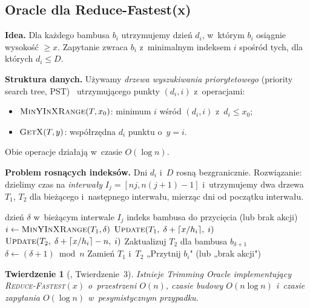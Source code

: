 \documentclass[12pt,a4paper]{article}
\theoremstyle{plain}
\newtheorem{twierdzenie}{Twierdzenie}[section]
\theoremstyle{definition}
\theoremstyle{remark}
\newcommand{\RF}{\textsc{Reduce-Fastest}}
\begin{document}
\subsection{Oracle dla Reduce-Fastest(x)}

\textbf{Idea.} Dla każdego bambusa $b_i$ utrzymujemy dzień $d_i$,
w~którym $b_i$ osiągnie wysokość $\geq x$. Zapytanie zwraca $b_i$
z~minimalnym indeksem $i$ spośród tych, dla których $d_i \leq D$.

\textbf{Struktura danych.} Używamy \emph{drzewa wyszukiwania priorytetowego}
(priority search tree, PST)~\cite{mccreight1985} utrzymującego punkty
$(d_i, i)$ z~operacjami:
\begin{itemize}[noitemsep]
  \item $\textsc{MinYInXRange}(T, x_0)$: minimum $i$ wśród $(d_i, i)$
        z~$d_i \leq x_0$;
  \item $\textsc{GetX}(T, y)$: współrzędna $d_i$ punktu o~$y = i$.
\end{itemize}
Obie operacje działają w~czasie $O(\log n)$.

\textbf{Problem rosnących indeksów.} Dni $d_i$ i~$D$ rosną bezgranicznie.
Rozwiązanie: dzielimy czas na \emph{interwały} $I_j = [nj, n(j+1)-1]$
i~utrzymujemy dwa drzewa $T_1$, $T_2$ dla bieżącego i~następnego
interwału, mierząc dni od początku interwału.

\begin{algorithm}[htbp]
\caption{Trimming Oracle dla \RF$(x)$ – funkcja Query}
\label{alg:rf}
\begin{algorithmic}[1]
\Require dzień $\delta$ w~bieżącym interwale $I_j$
\Ensure indeks bambusa do przycięcia (lub brak akcji)
\State $i \gets \textsc{MinYInXRange}(T_1, \delta)$
  \State $\textsc{Update}(T_1,\; \delta + \lceil x/h_i \rceil,\; i)$
  \State $\textsc{Update}(T_2,\; \delta + \lceil x/h_i \rceil - n,\; i)$
\EndIf
\State Zaktualizuj $T_2$ dla bambusa $b_{\delta+1}$
\State $\delta \gets (\delta + 1) \bmod n$
  \State Zamień $T_1$ i~$T_2$
\EndIf
\State \Return „Przytnij $b_i$" (lub „brak akcji")
\end{algorithmic}
\end{algorithm}

\begin{twierdzenie}[\cite{bilo2022}, Twierdzenie~3]\label{thm:oracle-rf}
Istnieje Trimming Oracle implementujący \RF$(x)$ o~przestrzeni $O(n)$,
czasie budowy $O(n \log n)$ i~czasie zapytania $O(\log n)$ w~pesymistycznym
przypadku.
\end{twierdzenie}
\end{document}
